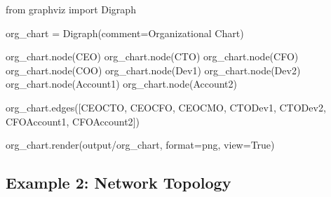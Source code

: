 \documentclass[
  letterpaper,
  DIV=11,
  numbers=noendperiod]{scrreprt}
\newenvironment{Shaded}{\begin{snugshade}}{\end{snugshade}}
\newcommand{\BuiltInTok}[1]{\textcolor[rgb]{0.00,0.23,0.31}{#1}}
\newcommand{\ImportTok}[1]{\textcolor[rgb]{0.00,0.46,0.62}{#1}}
\newcommand{\NormalTok}[1]{\textcolor[rgb]{0.00,0.23,0.31}{#1}}
\newcommand{\OperatorTok}[1]{\textcolor[rgb]{0.37,0.37,0.37}{#1}}
\newcommand{\StringTok}[1]{\textcolor[rgb]{0.13,0.47,0.30}{#1}}
\newcommand{\VariableTok}[1]{\textcolor[rgb]{0.07,0.07,0.07}{#1}}
\begin{document}
\begin{Shaded}
\begin{Highlighting}[]
\ImportTok{from}\NormalTok{ graphviz }\ImportTok{import}\NormalTok{ Digraph}

\NormalTok{org\_chart }\OperatorTok{=}\NormalTok{ Digraph(comment}\OperatorTok{=}\StringTok{\textquotesingle{}Organizational Chart\textquotesingle{}}\NormalTok{)}

\NormalTok{org\_chart.node(}\StringTok{\textquotesingle{}CEO\textquotesingle{}}\NormalTok{)}
\NormalTok{org\_chart.node(}\StringTok{\textquotesingle{}CTO\textquotesingle{}}\NormalTok{)}
\NormalTok{org\_chart.node(}\StringTok{\textquotesingle{}CFO\textquotesingle{}}\NormalTok{)}
\NormalTok{org\_chart.node(}\StringTok{\textquotesingle{}COO\textquotesingle{}}\NormalTok{)}
\NormalTok{org\_chart.node(}\StringTok{\textquotesingle{}Dev1\textquotesingle{}}\NormalTok{)}
\NormalTok{org\_chart.node(}\StringTok{\textquotesingle{}Dev2\textquotesingle{}}\NormalTok{)}
\NormalTok{org\_chart.node(}\StringTok{\textquotesingle{}Account1\textquotesingle{}}\NormalTok{)}
\NormalTok{org\_chart.node(}\StringTok{\textquotesingle{}Account2\textquotesingle{}}\NormalTok{)}

\NormalTok{org\_chart.edges([}\StringTok{\textquotesingle{}CEOCTO\textquotesingle{}}\NormalTok{, }\StringTok{\textquotesingle{}CEOCFO\textquotesingle{}}\NormalTok{, }\StringTok{\textquotesingle{}CEOCMO\textquotesingle{}}\NormalTok{, }\StringTok{\textquotesingle{}CTODev1\textquotesingle{}}\NormalTok{, }\StringTok{\textquotesingle{}CTODev2\textquotesingle{}}\NormalTok{, }\StringTok{\textquotesingle{}CFOAccount1\textquotesingle{}}\NormalTok{, }\StringTok{\textquotesingle{}CFOAccount2\textquotesingle{}}\NormalTok{])}

\NormalTok{org\_chart.render(}\StringTok{\textquotesingle{}output/org\_chart\textquotesingle{}}\NormalTok{, }\BuiltInTok{format}\OperatorTok{=}\StringTok{\textquotesingle{}png\textquotesingle{}}\NormalTok{, view}\OperatorTok{=}\VariableTok{True}\NormalTok{)}
\end{Highlighting}
\end{Shaded}

\subsection{Example 2: Network
Topology}\label{example-2-network-topology}
\end{document}
